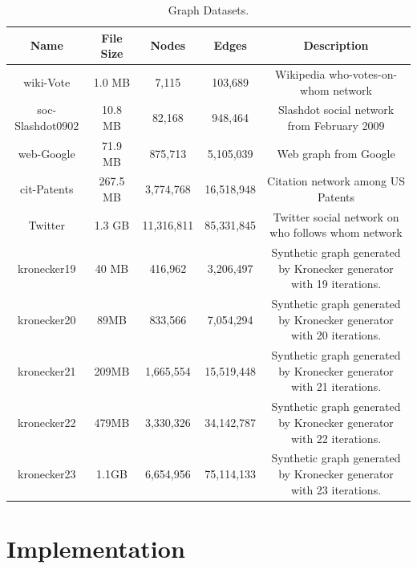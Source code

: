 \documentclass[10pt,conference,compsocconf]{IEEEtran}
\begin{document}
\begin{table}[!t]
\renewcommand{\arraystretch}{1.5}
\centering
\begin{tabular}{|c|c|c|c|c|}
\hline
\bfseries Name & \bfseries File Size & \bfseries Nodes & \bfseries Edges & \bfseries Description\\
\hline
wiki-Vote & 1.0 MB & 7,115 & 103,689 & Wikipedia who-votes-on-whom network\\
\hline
soc-Slashdot0902 & 10.8 MB & 82,168 & 948,464 & Slashdot social network from February 2009\\
\hline
web-Google & 71.9 MB & 875,713 & 5,105,039 & Web graph from Google\\
\hline
cit-Patents & 267.5 MB & 3,774,768 & 16,518,948 & Citation network among US Patents\\
\hline
Twitter & 1.3 GB & 11,316,811 & 85,331,845 & Twitter social network on who follows whom network\\
\hline
kronecker19 & 40 MB & 416,962 & 3,206,497 & Synthetic graph generated by Kronecker generator
 with 19 iterations.\\
\hline
kronecker20 & 89MB & 833,566 & 7,054,294 & Synthetic graph generated by Kronecker generator
 with 20 iterations.\\
\hline
kronecker21 & 209MB & 1,665,554 & 15,519,448 & Synthetic graph generated by Kronecker generator
 with 21 iterations.\\
\hline
kronecker22 & 479MB & 3,330,326 & 34,142,787 & Synthetic graph generated by Kronecker generator
 with 22 iterations.\\
\hline
kronecker23 & 1.1GB & 6,654,956 & 75,114,133 & Synthetic graph generated by Kronecker generator
 with 23 iterations.\\
\hline
\end{tabular}
\caption{Graph Datasets.}
\label{tab:attribs_graphs}
\end{table}





\section{Implementation}
\label{sec:impl}
\end{document}
